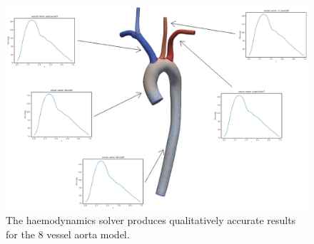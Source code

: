 \documentclass[a4paper, oneside]{discothesis}
\begin{document}
\begin{figure} [!ht]
	\centering
	\includegraphics[width=0.8\columnwidth]{figures/0007_annotated.eps}
	\caption{The haemodynamics solver produces qualitatively accurate results for the 8 vessel aorta model.}
	\label{fig:aorta}
\end{figure}
\end{document}

